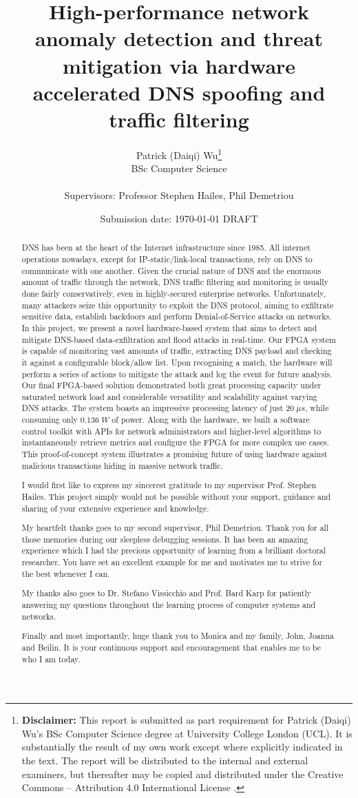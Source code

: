 \documentclass[a4paper]{report}
\title{{\vspace{-14em}}
{{\Huge High-performance network anomaly detection and threat mitigation via hardware accelerated DNS spoofing and traffic filtering}} \\
{\large}}
\date{Submission date: \today \; DRAFT}
\author{Patrick (Daiqi) Wu\thanks{
{\bf Disclaimer:}
This report is submitted as part requirement for Patrick (Daiqi) Wu's BSc Computer Science degree at University College London (UCL). It is
substantially the result of my own work except where explicitly indicated in the text.
The report will be distributed to the internal and external examiners, but thereafter may be copied and distributed under the Creative Commons -- Attribution 4.0 International License \cite{cc-by-4.0}.}
\\
BSc Computer Science\\ \\
Supervisors: Professor Stephen Hailes, Phil Demetriou}
\begin{document}
 
\onehalfspacing
\maketitle
\begin{abstract}
DNS has been at the heart of the Internet infrastructure since 1985. All internet operations nowadays, except for IP-static/link-local transactions, rely on DNS to communicate with one another. Given the crucial nature of DNS and the enormous amount of traffic through the network, DNS traffic filtering and monitoring is usually done fairly conservatively, even in highly-secured enterprise networks. Unfortunately, many attackers seize this opportunity to exploit the DNS protocol, aiming to exfiltrate sensitive data, establish backdoors and perform Denial-of-Service attacks on networks. In this project, we present a novel hardware-based system that aims to detect and mitigate DNS-based data-exfiltration and flood attacks in real-time. Our FPGA system is capable of monitoring vast amounts of traffic, extracting DNS payload and checking it against a configurable block/allow list. Upon recognising a match, the hardware will perform a series of actions to mitigate the attack and log the event for future analysis. Our final FPGA-based solution demonstrated both great processing capacity under saturated network load and considerable versatility and scalability against varying DNS attacks. The system boasts an impressive processing latency of just $20\; \mu s$, while consuming only $0.136 \; W$ of power. Along with the hardware, we built a software control toolkit with APIs for network administrators and higher-level algorithms to instantaneously retrieve metrics and configure the FPGA for more complex use cases. This proof-of-concept system illustrates a promising future of using hardware against malicious transactions hiding in massive network traffic.
\end{abstract}

\renewcommand{\abstractname}{Acknowledgements}
\begin{abstract}
I would first like to express my sincerest gratitude to my supervisor Prof. Stephen Hailes. This project simply would not be possible without your support, guidance and sharing of your extensive experience and knowledge.

My heartfelt thanks goes to my second supervisor, Phil Demetriou. Thank you for all those memories during our sleepless debugging sessions. It has been an amazing experience which I had the precious opportunity of learning from a brilliant doctoral researcher. You have set an excellent example for me and motivates me to strive for the best whenever I can.

My thanks also goes to Dr. Stefano Vissicchio and Prof. Bard Karp for patiently answering my questions throughout the learning process of computer systems and networks.

Finally and most importantly, huge thank you to Monica and my family, John, Joanna and Beilin. It is your continuous support and encouragement that enables me to be who I am today.
\end{abstract}
\end{document}
